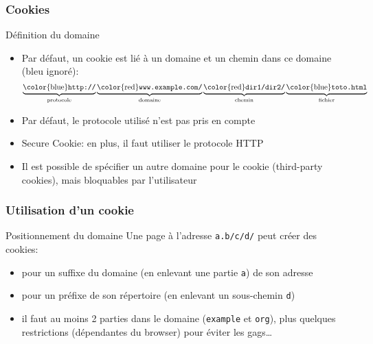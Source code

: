 \begin{reveals}
\begin{frame}
\end{frame}

\begin{frame}
  \frametitle{Cookies}

  \begin{block}{D{\'e}finition du domaine}
    \begin{itemize}
    \item Par d{\'e}faut, un cookie est li{\'e} {\`a} un domaine et un chemin dans
      ce domaine (bleu ignor\'e{}):
      $$
      \underbrace{\text{\color{blue}\tt http://}}_{\text{protocole}}
      \underbrace{\text{\color{red}\tt www.example.com/}}_{\text{domaine}}
      \underbrace{\text{\color{red}\tt dir1/dir2/}}_{\text{chemin}}
      \underbrace{\text{\color{blue}\tt toto.html}}_{\text{fichier}}
      $$
    \item Par d{\'e}faut, le protocole utilis{\'e} n'est pas pris en compte
    \item Secure Cookie: en plus, il faut utiliser le protocole HTTP
    \item Il est possible de sp{\'e}cifier un autre domaine pour le cookie
      (third-party cookies), mais bloquables par l'utilisateur
    \end{itemize}
  \end{block}

  \pause


\end{frame}

\begin{frame}
  \frametitle{Utilisation d'un cookie}

  \begin{block}{Positionnement du domaine}
    Une page \`a{} l'adresse \texttt{a.b/c/d/} peut cr\'eer des cookies:
    \begin{itemize}
    \item pour un suffixe du domaine (en enlevant une partie
      \texttt{a}) de son adresse
    \item pour un pr\'efixe de son r\'epertoire (en enlevant un
      sous-chemin \texttt{d})
    \item il faut au moins 2 parties dans le domaine (\texttt{example}
      et \texttt{org}), plus quelques restrictions (d\'ependantes du
      browser) pour \'eviter les gags\ldots{}
    \end{itemize}
  \end{block}


\end{frame}
\end{reveals}
